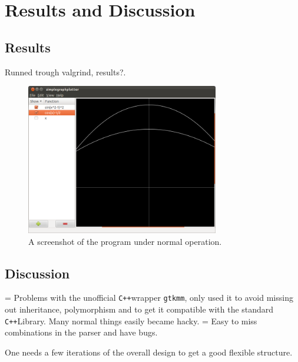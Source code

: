 \documentclass[a4paper,11pt]{kth-mag}
\newcommand{\Cpp}{\texttt{C++}}
\newcommand{\Gtkmm}{\texttt{gtkmm}}
\begin{document}
\chapter{Results and Discussion}

\section{Results}

Runned trough valgrind, results?.

\begin{figure}[H]
\begin{center}
    \includegraphics[width=0.75\textwidth]{screenshot00.png}
    \caption{\small{A screenshot of the program under normal operation.}}
   \label{fig:screenshot}
\end{center}
\end{figure}

\section{Discussion}
 = Problems with the unofficial \Cpp wrapper \Gtkmm, only used it to avoid
 missing out inheritance, polymorphism and to get it compatible with the
 standard \Cpp Library. Many normal things easily became hacky. 
 = Easy to miss combinations in the parser and have bugs.

 One needs a few iterations of the overall design to get a good flexible structure.
\end{document}
